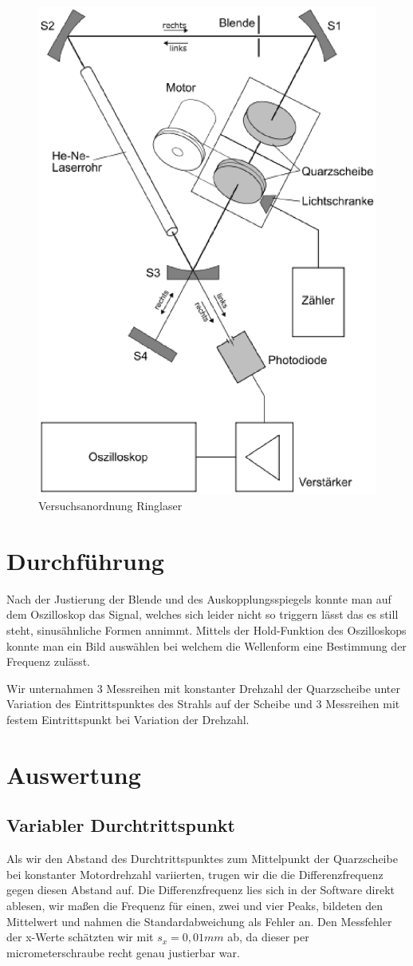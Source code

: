 \documentclass[12pt]{article}
\begin{document}
\begin{figure}[H]  
\centering
\includegraphics[width=0.7\linewidth]{pictures/abb4.eps}
\caption{Versuchsanordnung Ringlaser}
\label{versuchsaufbau}
\end{figure}

\section{Durchführung}
Nach der Justierung der Blende und des Auskopplungsspiegels konnte man auf dem Oszilloskop das Signal, welches sich leider nicht so triggern lässt das es 
still steht, sinusähnliche Formen annimmt. Mittels der Hold-Funktion des Oszilloskops konnte man ein Bild auswählen bei welchem die Wellenform eine
Bestimmung der Frequenz zulässt. 

Wir unternahmen 3 Messreihen mit konstanter Drehzahl der Quarzscheibe unter Variation des Eintrittspunktes des Strahls auf der Scheibe und 3 Messreihen
mit festem Eintrittspunkt bei Variation der Drehzahl.
\section{Auswertung}
\subsection{Variabler Durchtrittspunkt}
Als wir den Abstand des Durchtrittspunktes zum Mittelpunkt der Quarzscheibe bei konstanter Motordrehzahl variierten, trugen wir die die Differenzfrequenz gegen diesen Abstand auf. Die Differenzfrequenz lies sich in der Software direkt ablesen, wir maßen die Frequenz für einen, zwei und vier Peaks, bildeten den Mittelwert und nahmen die Standardabweichung als Fehler an. Den Messfehler der x-Werte schätzten wir mit $s_x=0,01mm$ ab, da dieser per micrometerschraube recht genau justierbar war.
\end{document}
